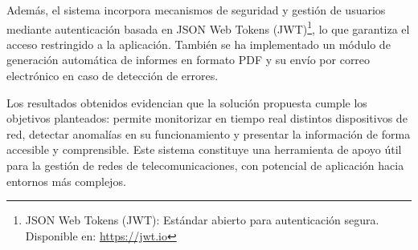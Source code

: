 Además, el sistema incorpora mecanismos de seguridad y gestión de usuarios mediante autenticación basada en JSON Web Tokens (JWT)\footnote{JSON Web Tokens (JWT): Estándar abierto para autenticación segura. Disponible en: \url{https://jwt.io}}, lo que garantiza el acceso restringido a la aplicación. También se ha implementado un módulo de generación automática de informes en formato PDF y su envío por correo electrónico en caso de detección de errores.

Los resultados obtenidos evidencian que la solución propuesta cumple los objetivos planteados: permite monitorizar en tiempo real distintos dispositivos de red, detectar anomalías en su funcionamiento y presentar la información de forma accesible y comprensible. Este sistema constituye una herramienta de apoyo útil para la gestión de redes de telecomunicaciones, con potencial de aplicación hacia entornos más complejos.